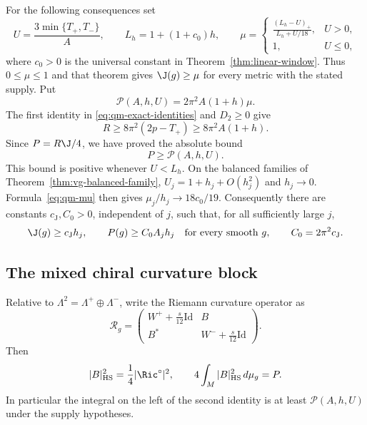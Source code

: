 For the following consequences set
\begin{equation}\label{eq:qm-mu}
 U=\frac{3\min\{T_+,T_-\}}A,\qquad L_h=1+(1+c_0)h,
 \qquad
 \mu=\begin{cases}
 \displaystyle\frac{(L_h-U)_+}{L_h+U/18},&U>0,\\[6pt]
 1,&U\le0,
 \end{cases}
\end{equation}
where $c_0>0$ is the universal constant in
Theorem~\ref{thm:linear-window}.  Thus $0\le\mu\le1$ and that theorem
gives $\J(g)\ge\mu$ for every metric with the stated supply.  Put
\begin{equation}\label{eq:qm-P-bound}
 \mathscr P(A,h,U)=2\pi^2A(1+h)\mu.
\end{equation}
The first identity in \eqref{eq:qm-exact-identities} and $D_2\ge0$ give
\[
 R\ge8\pi^2(2p-T_+)\ge8\pi^2A(1+h).
\]
Since $P=R\J/4$, we have proved the absolute bound
\begin{equation}\label{eq:qm-absolute-P}
 P\ge\mathscr P(A,h,U).
\end{equation}
This bound is positive whenever $U<L_h$.  On the balanced families of
Theorem~\ref{thm:vg-balanced-family},
$U_j=1+h_j+O(h_j^2)$ and $h_j\to0$.  Formula~\eqref{eq:qm-mu}
then gives $\mu_j/h_j\to18c_0/19$.  Consequently there are constants
$c_{\mathrm J},C_0>0$, independent of $j$, such that, for all sufficiently
large $j$,
\begin{equation}\label{eq:qm-balanced-P}
 \J(g)\ge c_{\mathrm J}h_j,\qquad
 P(g)\ge C_0A_jh_j\quad\hbox{for every smooth }g,
 \qquad C_0=2\pi^2c_{\mathrm J}.
\end{equation}

\subsection{The mixed chiral curvature block}

\begin{proposition}\label{prop:qm-chiral-block}
Relative to $\Lambda^2=\Lambda^+\oplus\Lambda^-$, write the Riemann
curvature operator as
\[
 \mathcal R_g=
 \begin{pmatrix}
 W^++\frac{s}{12}\mathrm{Id}&B\\
 B^*&W^-+\frac{s}{12}\mathrm{Id}
 \end{pmatrix}.
\]
Then
\begin{equation}\label{eq:qm-block-norm}
 |B|_{\mathrm{HS}}^2=\frac14|\Ric^\circ|^2,
 \qquad 4\int_M|B|_{\mathrm{HS}}^2\,d\mu_g=P.
\end{equation}
In particular the integral on the left of the second identity is at
least $\mathscr P(A,h,U)$ under the supply hypotheses.
\end{proposition}

